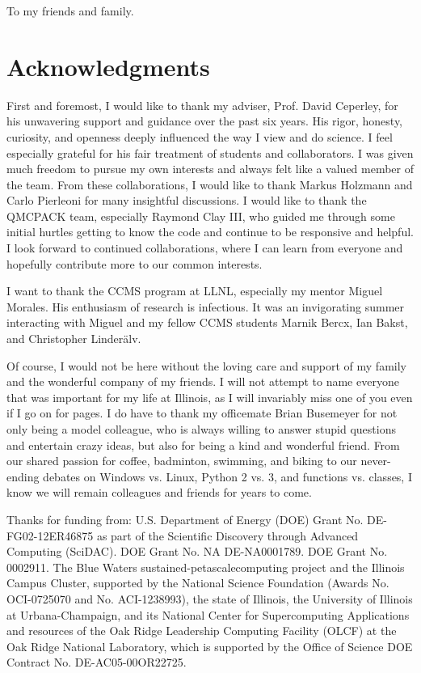 \begin{dedication}
To my friends and family.
\end{dedication}

\chapter*{Acknowledgments}
First and foremost, I would like to thank my adviser, Prof. David Ceperley, for his unwavering support and guidance over the past six years.
His rigor, honesty, curiosity, and openness deeply influenced the way I view and do science.
I feel especially grateful for his fair treatment of students and collaborators.
I was given much freedom to pursue my own interests and always felt like a valued member of the team.
From these collaborations, I would like to thank Markus Holzmann and Carlo Pierleoni for many insightful discussions.
I would like to thank the QMCPACK team, especially Raymond Clay III, who guided me through some initial hurtles getting to know the code and continue to be responsive and helpful.
I look forward to continued collaborations, where I can learn from everyone and hopefully contribute more to our common interests.

I want to thank the CCMS program at LLNL, especially my mentor Miguel Morales.
His enthusiasm of research is infectious.
It was an invigorating summer interacting with Miguel and my fellow CCMS students Marnik Bercx, Ian Bakst, and Christopher Linder\"alv.

Of course, I would not be here without the loving care and support of my family and the wonderful company of my friends. I will not attempt to name everyone that was important for my life at Illinois, as I will invariably miss one of you even if I go on for pages.
I do have to thank my officemate Brian Busemeyer for not only being a model colleague, who is always willing to answer stupid questions and entertain crazy ideas, but also for being a kind and wonderful friend.
From our shared passion for coffee, badminton, swimming, and biking to our never-ending debates on Windows vs. Linux, Python 2 vs. 3, and functions vs. classes, I know we will remain colleagues and friends for years to come.

Thanks for funding from:
U.S. Department of Energy (DOE) Grant No. DE-FG02-12ER46875 as part of the Scientific Discovery through Advanced Computing (SciDAC). DOE Grant No. NA DE-NA0001789. DOE Grant No. 0002911. The Blue Waters sustained-petascalecomputing project and the Illinois Campus Cluster, supported by the National Science Foundation (Awards No. OCI-0725070 and No. ACI-1238993), the state of Illinois, the University of Illinois at Urbana-Champaign, and its National Center for Supercomputing Applications and resources of the Oak Ridge Leadership Computing Facility (OLCF) at the Oak  Ridge National Laboratory, which is supported by the Office of Science DOE Contract No. DE-AC05-00OR22725.
